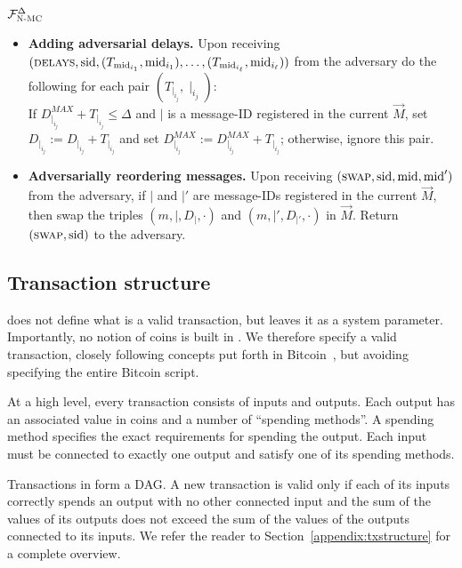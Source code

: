 \begin{systembox}{$\mathcal{F}_{\textsc{N-MC}}^{\Delta}$}
{\begin{itemize}
			\smallskip
			\item \textbf{Adding adversarial delays.}
			Upon receiving $(\textsc{delays},\text{sid}, (T_{\text{mid}_{i_1}},\text{mid}_{i_1}), \ldots, (T_{\text{mid}_{i_\ell}},\text{mid}_{i_\ell}))$ from the adversary do the following for each pair $(T_{\mid_{i_j}},\mid_{i_j})$: \\
			If $D_{\mid_{i_j}}^{MAX}+T_{\mid_{i_j}}\leq\Delta$ and $\mid$ is a message-ID registered in the current $\vec{M}$, set $D_{\mid_{i_j}}:= D_{\mid_{i_j}} + T_{\mid_{i_j}}$ and set $D_{\mid_{i_j}}^{MAX}:= D_{\mid_{i_j}}^{MAX} + T_{\mid_{i_j}}$; otherwise, ignore this pair.   
			
			\smallskip
			\item \textbf{Adversarially reordering messages.}
			Upon receiving $(\textsc{swap},\text{sid}, \text{mid}, \text{mid}')$ from the adversary, if $\mid$ and $\mid'$ are message-IDs registered in the current $\vec{M}$, then swap the triples $(m,\mid,D_\mid,\cdot)$ and $(m,\mid', D_{\mid'},\cdot)$ in $\vec{M}$. Return $(\textsc{swap},\text{sid})$ to the adversary. 
		\end{itemize}
	}
\end{systembox}

  \subsection{Transaction structure}
    \ledger{} does not define what is a valid transaction, but leaves it as a
    system parameter. Importantly, no notion of coins is built in \ledger. We
    therefore specify a valid transaction, closely following concepts put forth
    in Bitcoin~\cite{bitcoin}, but avoiding specifying the entire Bitcoin
    script.

    At a high level, every transaction consists of inputs and outputs. Each
    output has an associated value in coins and a number of ``spending
    methods''. A spending method specifies the exact requirements for spending
    the output. Each input must be connected to exactly one output and satisfy
    one of its spending methods.

    Transactions in \ledger{} form a DAG. A new transaction is valid only if
    each of its inputs correctly spends an output with no other connected input
    and the sum of the values of its outputs does not exceed the sum of the
    values of the outputs connected to its inputs. We refer the reader to
    Section~\ref{appendix:txstructure} for a complete overview.

